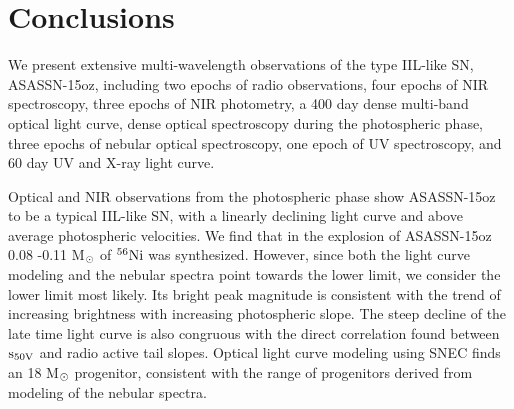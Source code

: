 \documentclass[a4paper,fleqn,usenatbib]{mnras}
\newcommand{\msun}{M$\rm{_{\odot}}$ }
\begin{document}
\section{Conclusions}\label{sec:conclude}
We present extensive multi-wavelength observations of the type IIL-like SN, ASASSN-15oz, including two epochs of radio observations, four epochs of NIR spectroscopy, three epochs of NIR photometry, a 400 day dense multi-band optical light curve, dense optical spectroscopy during the photospheric phase, three epochs of nebular optical spectroscopy,  one epoch of UV spectroscopy, and 60 day UV and X-ray light curve.

Optical and NIR observations from the photospheric phase show ASASSN-15oz to be a typical IIL-like SN, with a linearly declining light curve and above average photospheric velocities. 
We find that in the explosion of ASASSN-15oz 0.08 -0.11 \msun of $\rm{{}^{56}Ni}$ was synthesized. 
However, since both the light curve modeling and the nebular spectra point towards the lower limit, we consider the lower limit most likely.
Its bright peak magnitude is consistent with the trend of increasing brightness with increasing photospheric slope. 
The steep decline of the late time light curve is also congruous with the direct correlation found between $\rm{s_{50V}}$ and radio active tail slopes.
Optical light curve modeling using SNEC finds an 18 \msun progenitor, consistent with the range of progenitors derived from modeling of the nebular spectra.
\end{document}
